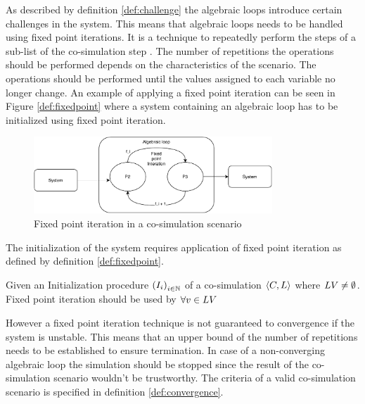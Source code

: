 As described by definition \ref{def:challenge} the algebraic loops introduce certain challenges in the system. This means that algebraic loops needs to be handled using fixed point iterations\cite{Gomes2018}. It is a technique to repeatedly perform the steps of a sub-list of the co-simulation step . The number of repetitions the operations should be performed depends on the characteristics of the scenario. The operations should be performed until the values assigned to each variable no longer change. 
An example of applying a fixed point iteration can be seen in Figure \ref{def:fixedpoint} where a system containing an algebraic loop has to be initialized using fixed point iteration.

\begin{figure}[H]
    \centering
    \includegraphics[width=0.8\textwidth]{images/fixedpoint.pdf}
    \caption{Fixed point iteration in a co-simulation scenario}
    \label{fig:fixedpont}
\end{figure}

The initialization of the system requires application of fixed point iteration as defined by definition \ref{def:fixedpoint}.
\begin{definition}\label{def:fixedpoint}
Given an Initialization procedure $ \left( I_i \right)_{i \in \mathbb{N}}$ of a co-simulation $ \left\langle C, L \right\rangle $ where $LV \neq \emptyset$.\\
Fixed point iteration should be used by 
$\forall v \in LV $

\end{definition}

However a fixed point iteration technique is not guaranteed to convergence if the system is unstable. This means that an upper bound of the number of repetitions needs to be established to ensure termination. In case of a non-converging algebraic loop the simulation should be stopped since the result of the co-simulation scenario wouldn't be trustworthy. The criteria of a valid co-simulation scenario is specified in definition \ref{def:convergence}.

